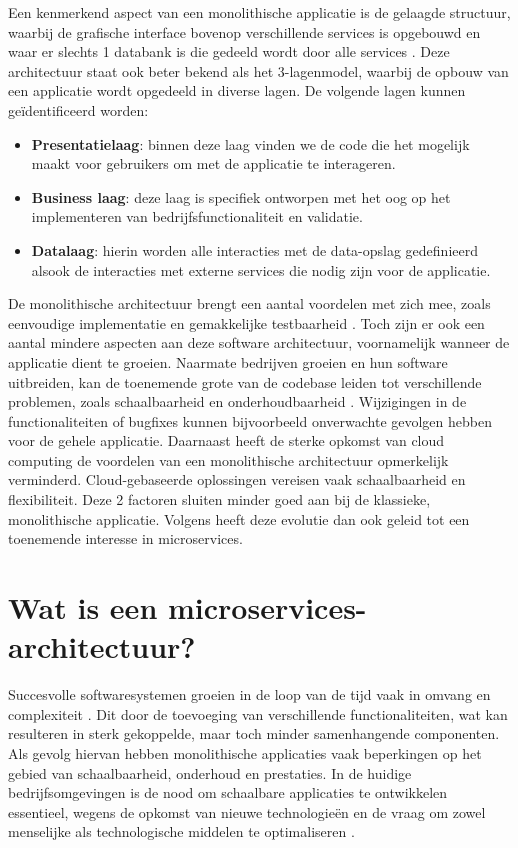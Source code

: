 Een kenmerkend aspect van een monolithische applicatie is de gelaagde structuur, waarbij de grafische interface bovenop verschillende services is opgebouwd en waar er slechts 1 databank is die gedeeld wordt door alle services \autocite{Velepucha2023}. Deze architectuur staat ook beter bekend als het 3-lagenmodel, waarbij de opbouw van een applicatie wordt opgedeeld in diverse lagen. De volgende lagen kunnen geïdentificeerd worden:

\begin{itemize}
	\item \textbf{Presentatielaag}: binnen deze laag vinden we de code die het mogelijk maakt voor gebruikers om met de applicatie te interageren.
	\item \textbf{Business laag}: deze laag is specifiek ontworpen met het oog op het implementeren van bedrijfsfunctionaliteit en validatie.
	\item \textbf{Datalaag}: hierin worden alle interacties met de data-opslag gedefinieerd alsook de interacties met externe services die nodig zijn voor de applicatie.
\end{itemize}

De monolithische architectuur brengt een aantal voordelen met zich mee, zoals eenvoudige implementatie en gemakkelijke testbaarheid \autocite{Li2022}. Toch zijn er ook een aantal mindere aspecten aan deze software architectuur, voornamelijk wanneer de applicatie dient te groeien. Naarmate bedrijven groeien en hun software uitbreiden, kan de toenemende grote van de codebase leiden tot verschillende problemen, zoals schaalbaarheid en onderhoudbaarheid \autocite{Wei2025}. Wijzigingen in de functionaliteiten of bugfixes kunnen bijvoorbeeld onverwachte gevolgen hebben voor de gehele applicatie. Daarnaast heeft de sterke opkomst van cloud computing de voordelen van een monolithische architectuur opmerkelijk verminderd. Cloud-gebaseerde oplossingen vereisen vaak schaalbaarheid en flexibiliteit. Deze 2 factoren sluiten minder goed aan bij de klassieke, monolithische applicatie. Volgens \textcite{Wei2025} heeft deze evolutie dan ook geleid tot een toenemende interesse in microservices.

\section{Wat is een microservices-architectuur?}

Succesvolle softwaresystemen groeien in de loop van de tijd vaak in omvang en complexiteit \autocite{Abgaz2023}. Dit door de toevoeging van verschillende functionaliteiten, wat kan resulteren in sterk gekoppelde, maar toch minder samenhangende componenten. Als gevolg hiervan hebben monolithische applicaties vaak beperkingen op het gebied van schaalbaarheid, onderhoud en prestaties. In de huidige bedrijfsomgevingen is de nood om schaalbare applicaties te ontwikkelen essentieel, wegens de opkomst van nieuwe technologieën en de vraag om zowel menselijke als technologische middelen te optimaliseren \autocite{Nayim2023}.\newline

